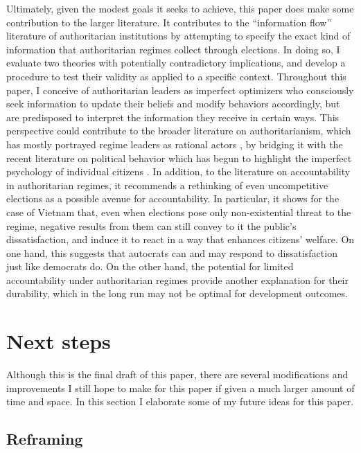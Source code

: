 \documentclass[12pt]{article}\usepackage[]{graphicx}\usepackage[]{color}
\newcommand{\1}{\mathbbm{1}}
\begin{document}
Ultimately, given the modest goals it seeks to achieve, this paper does make some contribution to the larger literature. It contributes to the ``information flow'' literature of authoritarian institutions by attempting to specify the exact kind of information that authoritarian regimes collect through elections. In doing so, I evaluate two theories with potentially contradictory implications, and develop a procedure to test their validity as applied to a specific context. Throughout this paper, I conceive of authoritarian leaders as imperfect optimizers who consciously seek information to update their beliefs and modify behaviors accordingly, but are predisposed to interpret the information they receive in certain ways. This perspective could contribute to the broader literature on authoritarianism, which has mostly portrayed regime leaders as rational actors \citep[e.g.][]{AR2001}, by bridging it with the recent literature on political behavior which has begun to highlight the imperfect psychology of individual citizens \citep[e.g.][]{AchenBartels2016}. In addition, to the literature on accountability in authoritarian regimes, it recommends a rethinking of even uncompetitive elections as a possible avenue for accountability. In particular, it shows for the case of Vietnam that, even when elections pose only non-existential threat to the regime, negative results from them can still convey to it the public's dissatisfaction, and induce it to react in a way that enhances citizens' welfare. On one hand, this suggests that autocrats can and may respond to dissatisfaction just like democrats do. On the other hand, the potential for limited accountability under authoritarian regimes provide another explanation for their durability, which in the long run may not be optimal for development outcomes.



\newpage
\appendix

\section{Next steps}
Although this is the final draft of this paper, there are several modifications and improvements I still hope to make for this paper if given a much larger amount of time and space. In this section I elaborate some of my future ideas for this paper.

\subsection{Reframing}
\end{document}
